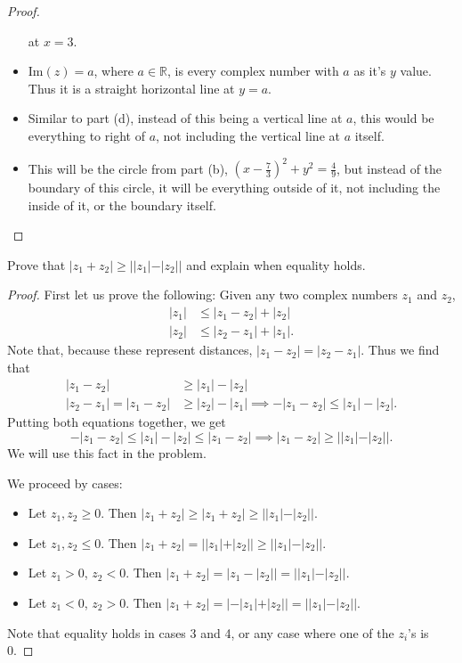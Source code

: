 \documentclass[12pt]{article}
\newenvironment{statement}[2][Statement]{\begin{trivlist}
\item[\hskip \labelsep {\bfseries #1}\hskip \labelsep {\bfseries #2.}]}{\end{trivlist}}
\begin{document}
\begin{proof}
\begin{itemize}
      at $x=3$. 
    \item[(e)] $\text{Im}(z)=a$, where $a \in \mathbb{R}$, is every complex number with $a$ as it's $y$ value. Thus it 
      is a straight horizontal line at $y=a$. 
    \item[(f)] Similar to part (d), instead of this being a vertical line at $a$, this would be everything to right of 
      $a$, not including the vertical line at $a$ itself. 
    \item[(g)] This will be the circle from part (b), $( x- \frac{7}{3} )^2 + y^2 = \frac{4}{9}$, but instead of 
      the boundary of this circle, it will be everything outside of it, not including the inside of it, or the boundary itself. 
  \end{itemize}
\end{proof}

\begin{statement}[Problem]{2}
  Prove that $|z_1 + z_2 | \geq ||z_1| - |z_2||$ and explain when equality holds.
\end{statement}
\begin{proof}
  First let us prove the following: Given any two complex numbers $z_1$ and $z_2$,
  \begin{align*}
    |z_1| &\leq |z_1-z_2|+|z_2| \\
    |z_2| &\leq |z_2-z_1|+|z_1|.
  \end{align*}
  Note that, because these represent distances, $|z_1 - z_2| = |z_2 - z_1|$. Thus we find that 
  \begin{align*}
    |z_1-z_2| &\geq |z_1|-|z_2| \\
    |z_2-z_1| = |z_1 - z_2| &\geq |z_2|-|z_1| \implies -|z_1 - z_2| \leq |z_1| - |z_2|.
  \end{align*}
  Putting both equations together, we get
  \begin{equation*}
    -|z_1-z_2| \leq |z_1|-|z_2|\leq|z_1-z_2| \implies |z_1 - z_2| \geq ||z_1|-|z_2||.
  \end{equation*}
  We will use this fact in the problem.
  \par We proceed by cases:
  \begin{itemize}
    \item[Case 1:] Let $z_1,z_2 \geq 0$. Then $|z_1 + z_2| \geq |z_1+z_2| \geq ||z_1|-|z_2||$.
    \item[Case 2:] Let $z_1,z_2 \leq 0$. Then $|z_1+z_2|=||z_1|+|z_2|| \geq ||z_1|-|z_2||$.
    \item[Case 3:] Let $z_1 > 0$, $z_2 < 0$. Then $|z_1+z_2| =|z_1-|z_2||=||z_1|-|z_2||$. 
    \item[Case 4:] Let $z_1 < 0$, $z_2 > 0$. Then $|z_1 + z_2| = |-|z_1|+|z_2||=||z_1|-|z_2||$. 
  \end{itemize}
  Note that equality holds in cases 3 and 4, or any case where one of the $z_i$'s is 0.
\end{proof}
\end{document}
